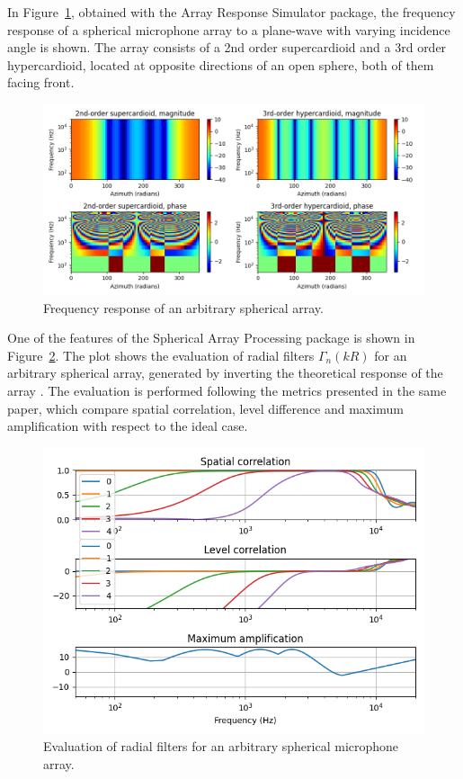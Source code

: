 In Figure~\ref{fig:array_response}, obtained with the Array Response Simulator package, the frequency response of a spherical microphone array to a plane-wave with varying incidence angle is shown. The array consists of a 2nd order supercardioid and a 3rd order hypercardioid, located at opposite directions of an open sphere, both of them facing front. \\

\begin{figure}[ht!]
  \centering
    \includegraphics[width=\textwidth]{Figures/DataGeneration/array_response.png}
    \caption{Frequency response of an arbitrary spherical array.}
    \label{fig:array_response}
\end{figure}


One of the features of the Spherical Array Processing package is shown in Figure~\ref{fig:sht_filters}. The plot shows the evaluation of radial filters $\Gamma_n(kR)$ for an arbitrary spherical array, generated by inverting the theoretical response of the array \cite{Bertet2006}. 
The evaluation is performed following the metrics presented in the same paper, which compare spatial correlation, level difference and maximum amplification with respect to the ideal case. \\

\begin{figure}[th!]
  \centering
    \includegraphics[width=1\textwidth]{Figures/DataGeneration/sht_filters.png}
    \caption{Evaluation of radial filters for an arbitrary spherical microphone array.}
    \label{fig:sht_filters}
\end{figure}

